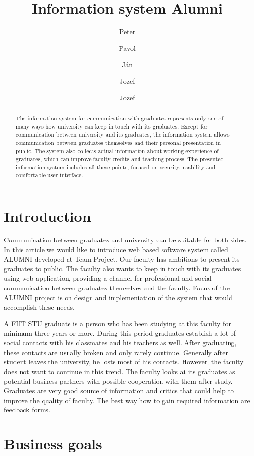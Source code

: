 \documentclass{iitsrc}[2006/14/02]
\title{Information system Alumni}
\author{Peter}{C\'ich}
\author{Pavol}{F\'abik}
\author{J\'an}{Garaj}
\author{Jozef}{Hergott}
\author{Jozef}{Hopko}
\begin{document}
\begin{abstract}
The information system for communication with graduates represents only one of many ways how university can keep in touch with its graduates. Except for communication between university and its graduates, the information system allows communication between graduates themselves and their personal presentation in public. The system also collects actual information about working experience of graduates, which can improve faculty credits and teaching process. The presented information system includes all these points, focused on security, usability and comfortable user interface.
\end{abstract}


\section{Introduction}

Communication between graduates and university can be suitable for both sides. In this article we would like to introduce web based software system called ALUMNI developed at Team Project. Our faculty has ambitions to present its graduates to public. The faculty also wants to keep in touch with its graduates using web application, providing a channel for professional and social communication between graduates themselves and the faculty. Focus of the ALUMNI project is on design and implementation of the system that would accomplish these needs. 

A FIIT STU graduate is a person who has been studying at this faculty for minimum three years or more. During this period graduates establish a lot of social contacts with his classmates and his teachers as well. After graduating, these contacts are usually broken and only rarely continue. Generally after student leaves the university, he losts most of his contacts. However, the faculty does not want to continue in this trend. The faculty looks at its graduates as potential business partners with possible cooperation with them after study. Graduates are very good source of information and critics that could help to improve the quality of faculty. The best way how to gain required information are feedback forms.


\section{Business goals}
\end{document}

